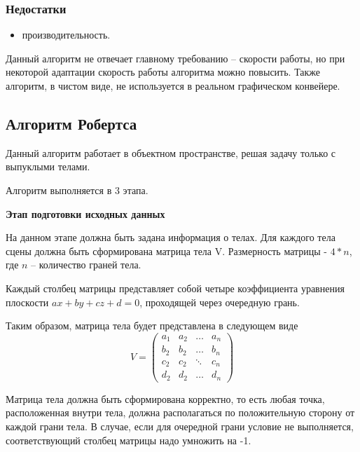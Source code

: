 \subsubsection*{Недостатки}
\begin{itemize}
\item	производительность.
\end{itemize}

Данный алгоритм не отвечает главному требованию – скорости работы, но при некоторой адаптации скорость работы алгоритма можно повысить.
Также алгоритм, в чистом виде, не используется в реальном графическом конвейере.

\subsection{Алгоритм Робертса}
Данный алгоритм работает в объектном пространстве, решая задачу только с выпуклыми телами.

Алгоритм выполняется в 3 этапа.

\textbf{Этап подготовки исходных данных}

На данном этапе должна быть задана информация о телах. Для каждого тела сцены должна быть сформирована матрица тела V. Размерность матрицы - $4*n$, где $n$ – количество граней тела.

Каждый столбец матрицы представляет собой четыре коэффициента уравнения плоскости  $ax+by+cz+d=0$, проходящей через очередную грань.

Таким образом, матрица тела будет представлена в следующем виде
\begin{equation}
	\label{eq:matr}
	V = \begin{pmatrix}
		a_{1} & a_{2} & \ldots & a_{n}\\
		b_{2} & b_{2} & \ldots & b_{n}\\
		c_{2} & c_{2} & \ddots & c_{n}\\
		d_{2} & d_{2} & \ldots & d_{n}
	\end{pmatrix}
\end{equation}

Матрица тела должна быть сформирована корректно, то есть любая точка, расположенная внутри тела, должна располагаться по положительную сторону от каждой грани тела. В случае, если для очередной грани условие не выполняется, соответствующий столбец матрицы надо умножить на -1. 

